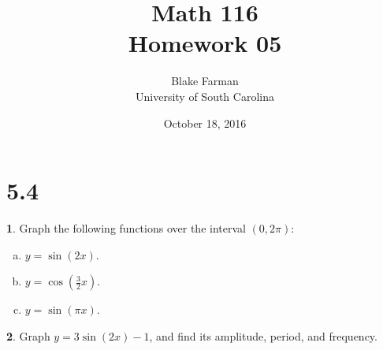 \documentclass[12pt]{book}
\author{Blake Farman\\University of South Carolina}
\title{Math 116\\Homework 05}
\date{October 18, 2016}
\theoremstyle{definition}
\newtheorem{thm}{}
\begin{document}
\maketitle

\section*{5.4}

\setcounter{thm}{3}
\begin{thm}
  Graph the following functions over the interval $(0, 2\pi)$:
  \begin{enumerate}[(a)]
  \item
    $\displaystyle{y = \sin(2x)}$.
  \item
    $\displaystyle{y = \cos\left(\frac{3}{2}x\right)}$.
  \item
    $\displaystyle{y = \sin(\pi x)}$.
  \end{enumerate}
\end{thm}

\setcounter{thm}{9}
\begin{thm}
  Graph $y = 3\sin(2x) - 1$, and find its amplitude, period, and frequency.
\end{thm}
\end{document}
